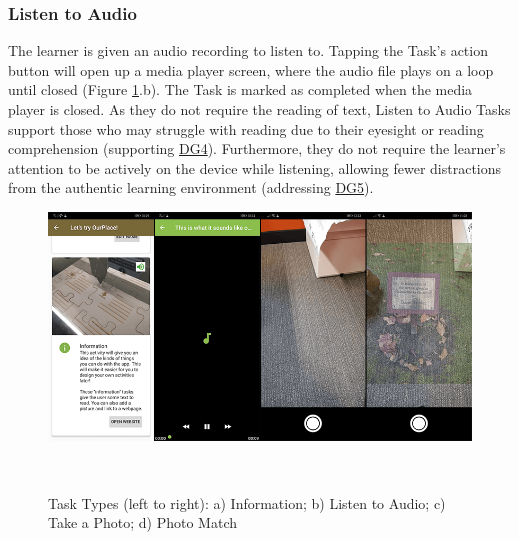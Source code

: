 \subsubsection*{Listen to Audio}
The learner is given an audio recording to listen to. Tapping the Task's action button will open up a media player screen, where the audio file plays on a loop until closed (Figure \ref{fig:TaskTypes1}.b). The Task is marked as completed when the media player is closed. As they do not require the reading of text, Listen to Audio Tasks support those who may struggle with reading due to their eyesight or reading comprehension (supporting \hyperref[DG4]{DG4}). Furthermore, they do not require the learner's attention to be actively on the device while listening, allowing fewer distractions from the authentic learning environment (addressing \hyperref[DG5]{DG5}).

\begin{figure}
  \centering
  \includegraphics[width=1\columnwidth]{images/chapter05/tasktypes1.png}
  \caption[Task Types (part 1)]{Task Types (left to right): a) Information; b) Listen to Audio; c) Take a Photo; d) Photo Match}~\label{fig:TaskTypes1}
\end{figure}
    
